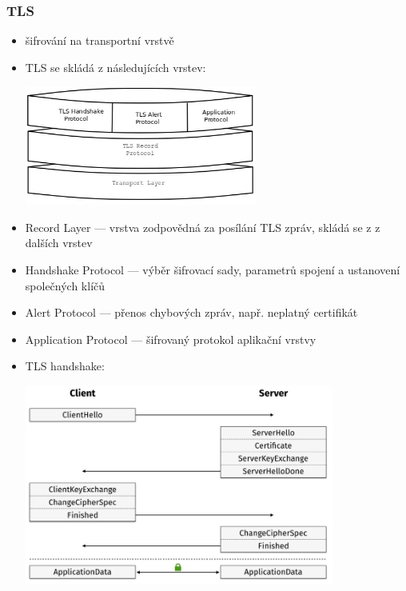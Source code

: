 \subsubsection*{TLS}
\begin{itemize}
	\item šifrování na transportní vrstvě
	\item TLS se skládá z následujících vrstev:
	
	\includegraphics[width=0.6\textwidth]{img/OB-12_0.jpg}
	
	\item Record Layer --- vrstva zodpovědná za posílání TLS zpráv, skládá se z z dalších vrstev
	\item Handshake Protocol --- výběr šifrovací sady, parametrů spojení a ustanovení společných klíčů
	\item Alert Protocol --- přenos chybových zpráv, např. neplatný certifikát
	\item Application Protocol --- šifrovaný protokol aplikační vrstvy
	\item TLS handshake:
	
	\includegraphics[width=0.8\textwidth]{img/OB-12_1.jpg}
	

\end{itemize}
